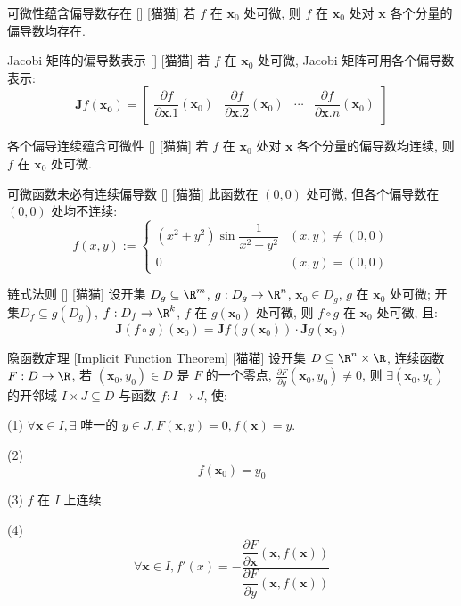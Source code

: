 \documentclass[UTF8]{ctexart}
\begin{document}
			\begin{ppt}
				[]
				{可微性蕴含偏导数存在}
				[]
				[猫猫]
				若 \(f\) 在 \(\bm{x}_0\) 处可微, 则 \(f\) 在 \(\bm{x}_0\) 处对 \(\bm{x}\) 各个分量的偏导数均存在. 
			\end{ppt}
			
			\begin{ppt}
				[]
				{Jacobi 矩阵的偏导数表示}
				[]
				[猫猫]
				若 \(f\) 在 \(\bm{x}_0\) 处可微, Jacobi 矩阵可用各个偏导数表示: 
				\[\bm{J}f(\bm{x_0})=
				\begin{bmatrix}
					\dfrac{\partial f}{\partial \bm{x}.1}(\bm{x}_0) & \dfrac{\partial f}{\partial \bm{x}.2}(\bm{x}_0) & \cdots & \dfrac{\partial f}{\partial \bm{x}.n}(\bm{x}_0)\\
				\end{bmatrix}\]
			\end{ppt}
			
			\begin{thm}
				[]
				{各个偏导连续蕴含可微性}
				[]
				[猫猫]
				若 \(f\) 在 \(\bm{x}_0\) 处对 \(\bm{x}\) 各个分量的偏导数均连续, 则 \(f\) 在 \(\bm{x}_0\) 处可微. 
			\end{thm}
			
			\begin{cxmp}
				[]
				{可微函数未必有连续偏导数}
				[]
				[猫猫]
				此函数在 \((0,0)\) 处可微, 但各个偏导数在 \((0,0)\) 处均不连续: 
				\[f(x,y):=
				\begin{cases}
					(x^2+y^2)\sin\dfrac{1}{x^2+y^2} & (x,y)\neq(0,0)\\
					0 & (x,y)=(0,0)
				\end{cases}\]
			\end{cxmp}
			
			\begin{thm}
				[]
				{链式法则}
				[]
				[猫猫]
				设开集 \(D_g\subseteq\R^m\), \(g:D_g\to\R^n\), \(\bm{x}_0\in D_g\), \(g\) 在 \(\bm{x}_0\) 处可微; 开集\(D_f\subseteq g(D_g)\), \(f:D_f\to\R^k\), \(f\) 在 \(g(\bm{x}_0)\) 处可微, 则 \(f\circ g\) 在 \(\bm{x}_0\) 处可微, 且: 
				\[\bm{J}(f\circ g)(\bm{x}_0)=\bm{J}f(g(\bm{x}_0))\cdot\bm{J}g(\bm{x}_0)\]
			\end{thm}

			\begin{thm}
				[]
				{隐函数定理}
				[Implicit Function Theorem]
				[猫猫]
				设开集 \(D\subseteq\R^n\times\R\), 连续函数 \(F:D\to\R\), 若 \((\bm{x}_0,y_0)\in D\) 是 \(F\) 的一个零点, \(\frac{\partial F}{\partial y}(\bm{x}_0,y_0)\neq 0\), 则 \(\exists(\bm{x}_0,y_0)\) 的开邻域 \(I\times J\subseteq D\) 与函数 \(f:I\to J\), 使: 

				(1) \(\forall\bm{x}\in I, \exists\) 唯一的 \(y\in J, F(\bm{x},y)=0, f(\bm{x})=y\). 

				(2) \[f(\bm{x}_0)=y_0\]

				(3) \(f\) 在 \(I\) 上连续. 

				(4) \[\forall\bm{x}\in I, f'(x)=-\frac{\dfrac{\partial F}{\partial\bm{x}}(\bm{x},f(\bm{x}))}{\dfrac{\partial F}{\partial y}(\bm{x},f(\bm{x}))}\]
			\end{thm}
\end{document}
